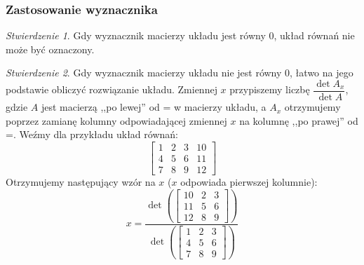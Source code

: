 \documentclass{article}
\theoremstyle{remark}
\newtheorem{lemma}{Stwierdzenie}[subsubsection]
\begin{document}
\subsubsection{Zastosowanie wyznacznika}
\begin{lemma}
  Gdy wyznacznik macierzy układu jest równy 0, układ równań nie może być oznaczony.
\end{lemma}
\begin{lemma}
  Gdy wyznacznik macierzy układu nie jest równy 0, łatwo na jego podstawie obliczyć
  rozwiązanie układu. Zmiennej $x$ przypiszemy liczbę $\dfrac{\det A_x}{\det A}$, gdzie
  $A$ jest macierzą ,,po lewej'' od = w macierzy układu, a $A_x$ otrzymujemy poprzez 
  zamianę kolumny odpowiadającej zmiennej $x$ na kolumnę ,,po prawej'' od =.
  Weźmy dla przykładu układ równań:
  \[\left[
    \begin{array}{lll|l}
      1&2&3&10\\
      4&5&6&11\\
      7&8&9&12
    \end{array}
  \right]\]
  Otrzymujemy następujący wzór na $x$ ($x$ odpowiada pierwszej kolumnie):
  \[x = \frac{\det\left(\left[
    \begin{array}{lll}
      10&2&3\\
      11&5&6\\
      12&8&9
    \end{array}
  \right]\right)}{\det\left(\left[
    \begin{array}{lll}
      1&2&3\\
      4&5&6\\
      7&8&9
    \end{array}
  \right]\right)}\]
\end{lemma}

\printindex
\end{document}
